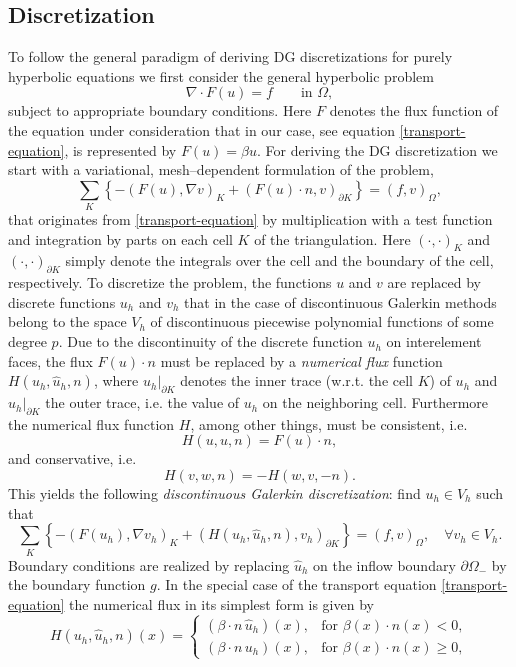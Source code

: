 \documentclass[11pt]{article}
\begin{document}
\subsection{Discretization}
To follow the general paradigm of deriving DG discretizations for purely
hyperbolic equations we first consider the general hyperbolic problem
\[
  \nabla\cdot F(u)=f  \qquad\mbox{in }\Omega,
\]
subject to appropriate boundary conditions. Here $F$ denotes the flux
function of the equation under consideration that in our case, see
equation \eqref{transport-equation}, is represented by $F(u)=\beta u$.
For deriving the DG discretization we start with a variational,
mesh--dependent formulation of the problem,
\[
  \sum_K\left\{-(F(u),\nabla v)_K+(F(u)\cdot n, v)_{\partial K}\right\}=(f,v)_\Omega,
\]
that originates from \eqref{transport-equation} by multiplication with
a test function and integration by parts on each cell $K$ of the
triangulation. Here $(\cdot, \cdot)_K$ and $(\cdot, \cdot)_{\partial
  K}$ simply denote the integrals over the cell and the boundary of
the cell, respectively. To discretize the problem, the functions $u$ 
and $v$ are replaced by discrete functions $u_h$ and $v_h$ that in the
case of discontinuous Galerkin methods belong to the space $V_h$ of
discontinuous piecewise polynomial functions of some degree $p$. Due
to the discontinuity of the discrete function $u_h$ on interelement
faces, the flux $F(u)\cdot n$ must be replaced by a \emph{numerical
  flux} function $H(u_h, \hat u_h, n)$, where $u_h|_{\partial K}$
denotes the inner trace (w.r.t.  the cell $K$) of $u_h$ and $\hat
u_h|_{\partial K}$ the outer trace, i.e. the value of $u_h$ on the
neighboring cell. Furthermore the numerical flux function $H$, among
other things, must be consistent, i.e.
\[
H(u,u,n)=F(u)\cdot n,
\]
and conservative, i.e.
\begin{equation}\label{conservative}
H(v,w,n)=-H(w,v,-n).
\end{equation}
This yields the following \emph{discontinuous Galerkin
  discretization}: find $u_h\in V_h$ such that
\begin{equation}\label{dg-scheme}
  \sum_K\left\{-(F(u_h),\nabla v_h)_K+(H(u_h,\hat u_h,n), v_h)_{\partial K}\right\}=(f,v)_\Omega, \quad\forall v_h\in V_h.
\end{equation}
Boundary conditions are realized by replacing $\hat u_h$ on the inflow boundary $\partial\Omega_-$ by the boundary function $g$.
In the special case of the transport equation
\eqref{transport-equation} the numerical flux in its simplest form
is given by
\begin{equation}\label{flux-transport-equation}
  H(u_h,\hat u_h,n)(x)=\left\{\begin{array}{ll}
      (\beta\cdot n\, \hat u_h)(x),&\mbox{for } \beta(x)\cdot n(x)<0,\\
      (\beta\cdot n\, u_h)(x),&\mbox{for } \beta(x)\cdot n(x)\geq 0,
\end{array}
\right.
\end{equation}
\end{document}
